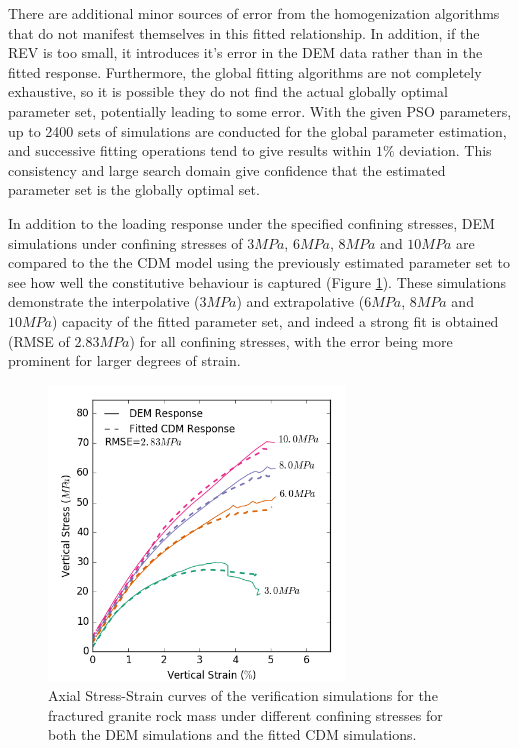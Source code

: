 There are additional minor sources of error from the homogenization algorithms that do not manifest themselves in this fitted relationship.  In addition, if the REV is too small, it introduces it's error in the DEM data rather than in the fitted response. Furthermore, the global fitting algorithms are not completely exhaustive, so it is possible they do not find the actual globally optimal parameter set, potentially leading to some error. With the given PSO parameters, up to 2400 sets of simulations are conducted for the global parameter estimation, and successive fitting operations tend to give results within $1\%$ deviation. This consistency and large search domain give confidence that the estimated parameter set is the globally optimal set. 

In addition to the loading response under the specified confining stresses, DEM simulations under confining stresses of $3MPa$, $6MPa$, $8MPa$ and $10MPa$ are compared to the the CDM model using the previously estimated parameter set to see how well the constitutive behaviour is captured (Figure \ref{fig:fitted2}). These simulations demonstrate the interpolative ($3MPa$) and extrapolative ($6MPa$, $8MPa$ and $10MPa$) capacity of the fitted parameter set, and indeed a strong fit is obtained (RMSE of $2.83MPa$) for all confining stresses, with the error being more prominent for larger degrees of strain.

\begin{figure}[!htb]
\begin{center}
\includegraphics[width=0.7\textwidth]{figures/Chapter5/DruckerVerificationCurves}
\caption{{\label{fig:fitted2} Axial Stress-Strain curves of the verification simulations for the fractured granite rock mass under different confining stresses for both the DEM simulations and the fitted CDM simulations.%
}}
\end{center}
\end{figure}

